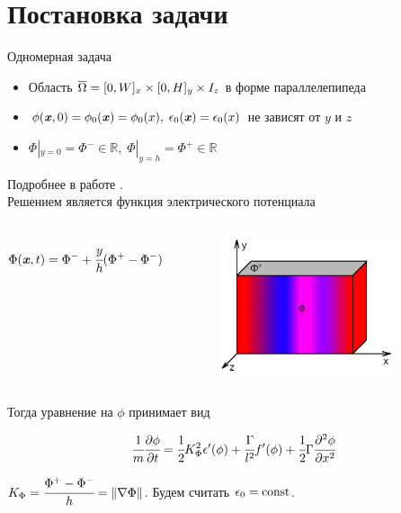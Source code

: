 
\section{Постановка задачи}

\begin{frame}{Одномерная задача}
\vspace{-0.3cm}
\begin{itemize}
	\item Область ${\overline{\Omega}} = [0, W]_x \times [0, H]_y \times I_z$ в форме параллелепипеда
	\item $\phi({\textbf{\textit{x}}}, 0) = \phi_0({\textbf{\textit{x}}}) = \phi_0(x), \; \epsilon_0({\textbf{\textit{x}}}) =
	\epsilon_0(x)$ не зависят от $y$ и $z$
	\item $\Phi|_{y = 0} = \Phi^- \in \mathbb{R}, \; \Phi|_{y = h} = \Phi^+ \in \mathbb{R}$
\end{itemize}
Подробнее в работе \cite{ponomarev_stability}. \\[0.3cm]
Решением является функция электрического потенциала
\begin{columns}
	\vspace{-1cm}
	$$\Phi(\vx, t) = \Phi^- \hm + \cfrac{y}{h}(\Phi^+ - \Phi^-)$$
	\begin{figure}
		\vspace*{-2.3cm}
		\hspace*{0.5cm}
		\includegraphics[width=0.85\textwidth]{figures/one_dim_problem.jpg}
	\end{figure}
\end{columns}
\vspace{-0.4cm}
Тогда уравнение на $\phi$ принимает вид
\begin{block}{}
	$$\cfrac{1}{m} \cfrac{\partial \phi}{\partial t} = \cfrac{1}{2} K_\Phi^2 \epsilon'(\phi) + \cfrac{\Gamma}{l^2} f'(\phi) + \cfrac{1}{2} \Gamma \cfrac{\partial^2 \phi}{\partial x^2}$$
\end{block}
$K_\Phi = \cfrac{\Phi^+ - \Phi^-}{h} = \| \nabla \Phi \|$. Будем считать $\epsilon_0 = \operatorname{{const}}$.
\end{frame}


